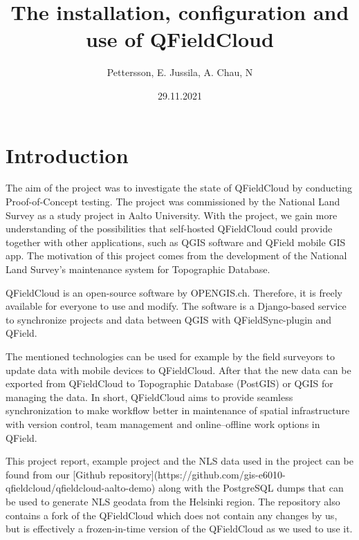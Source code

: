 \documentclass{article}
\title{The installation, configuration and use of QFieldCloud}
\author{Pettersson, E. Jussila, A. Chau, N}
\date{29.11.2021}
\begin{document}
\maketitle

\tableofcontents

\pagebreak
\section{Introduction}
The aim of the project was to investigate the state of QFieldCloud by conducting Proof-of-Concept testing. The project was commissioned by the National Land Survey as a study project in Aalto University. With the project, we gain more understanding of the possibilities that self-hosted QFieldCloud could provide together with other applications, such as QGIS software and QField mobile GIS app. The motivation of this project comes from the development of the National Land Survey's maintenance system for Topographic Database.

QFieldCloud is an open-source software by OPENGIS.ch. Therefore, it is freely available for everyone to use and modify. The software is a Django-based service to synchronize projects and data between QGIS with QFieldSync-plugin and QField. 

The mentioned technologies can be used for example by the field surveyors to update data with mobile devices to QFieldCloud. After that the new data can be exported from QFieldCloud to Topographic Database (PostGIS) or QGIS for managing the data. In short, QFieldCloud aims to provide seamless synchronization to make workflow better in maintenance of spatial infrastructure with version control, team management and online--offline work options in QField. 

\begin{markdown}
This project report, example project and the NLS data used in the project can be found from our [Github repository](https://github.com/gis-e6010-qfieldcloud/qfieldcloud-aalto-demo) along with the PostgreSQL dumps that can be used to generate NLS geodata from the Helsinki region. The repository also contains a fork of the QFieldCloud which does not contain any changes by us, but is effectively a frozen-in-time version of the QFieldCloud as we used to use it.  
\end{markdown}

\end{document}
